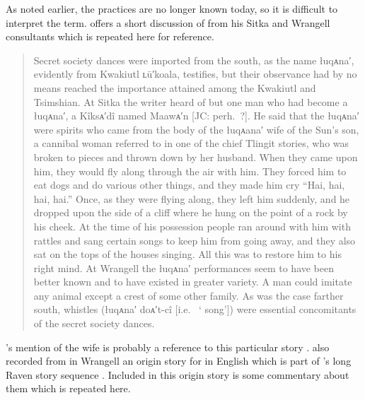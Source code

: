As noted earlier, the  practices are no longer known today, so it is difficult to interpret the term.
\textcite{swanton:1908} offers a short discussion of  from his Sitka and Wrangell consultants which is repeated here for reference.

\begin{quote}\small
Secret society dances were imported from the south, as the name łuqᴀna′, evidently from Kwakiutl ʟū′koala, testifies, but their observance had by no means reached the importance attained among the Kwakiutl and Tsimshian.
At Sitka the writer heard of but one man who had become a łuqᴀna′, a Kîksᴀ′dî named Maawᴀ′n [JC: perh.\ ?].
He said that the łuqᴀna′ were spirits who came from the body of the łuqᴀana′ wife of the Sun’s son, a cannibal woman referred to in one of the chief Tlingit stories, who was broken to pieces and thrown down by her husband.
When they came upon him, they would fly along through the air with him.
They forced him to eat dogs and do various other things, and they made him cry “Hai, hai, hai, hai.” Once, as they were flying along, they left him suddenly, and he dropped upon the side of a cliff where he hung on the point of a rock by his cheek.
At the time of his possession people ran around with him with rattles and sang certain songs to keep him from going away, and they also sat on the tops of the houses singing.
All this was to restore him to his right mind.
At Wrangell the łuqᴀna′ performances seem to have been better known and to have existed in greater variety.
A man could imitate any animal except a crest of some other family.
As was the case farther south, whistles (łuqᴀna′ doᴀ′t-cî [i.e.\  ‘ song’]) were essential concomitants of the secret society dances.
\end{quote}

\citeauthor{swanton:1909}’s mention of the  wife is probably a reference to this particular story . 
\citeauthor{swanton:1909} also recorded from  in Wrangell an origin story for  in English which is part of ’s long Raven story sequence \parencite[133–135]{swanton:1909}.
Included in this  origin story is some commentary about them which is repeated here.

